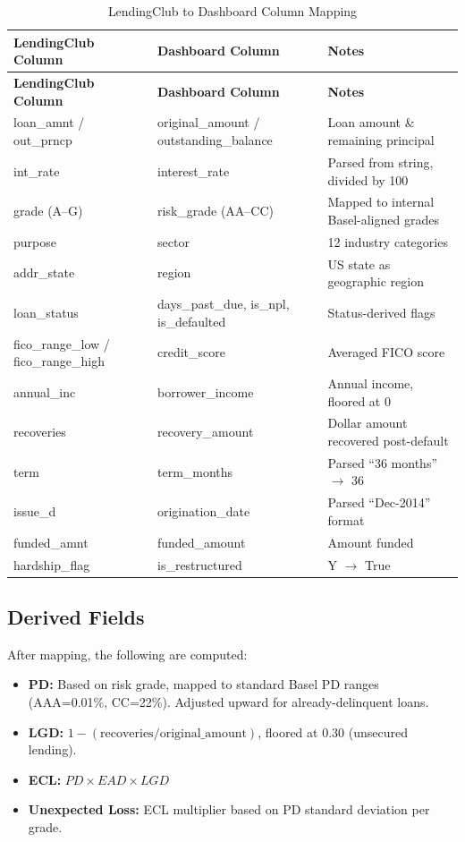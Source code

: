 \documentclass[12pt,a4paper]{article}
\begin{document}
\begin{longtable}{|>{\ttfamily\footnotesize}p{4.2cm}|>{\ttfamily\footnotesize}p{4.2cm}|p{4.5cm}|}
\caption{LendingClub to Dashboard Column Mapping}
\hline
\textbf{LendingClub Column} & \textbf{Dashboard Column} & \textbf{Notes} \\
\hline
\endfirsthead
\hline
\textbf{LendingClub Column} & \textbf{Dashboard Column} & \textbf{Notes} \\
\hline
\endhead
loan\_amnt / out\_prncp & original\_amount / outstanding\_balance & Loan amount \& remaining principal \\
int\_rate & interest\_rate & Parsed from string, divided by 100 \\
grade (A--G) & risk\_grade (AA--CC) & Mapped to internal Basel-aligned grades \\
purpose & sector & 12 industry categories \\
addr\_state & region & US state as geographic region \\
loan\_status & days\_past\_due, is\_npl, is\_defaulted & Status-derived flags \\
fico\_range\_low / fico\_range\_high & credit\_score & Averaged FICO score \\
annual\_inc & borrower\_income & Annual income, floored at 0 \\
recoveries & recovery\_amount & Dollar amount recovered post-default \\
term & term\_months & Parsed ``36 months'' $\rightarrow$ 36 \\
issue\_d & origination\_date & Parsed ``Dec-2014'' format \\
funded\_amnt & funded\_amount & Amount funded \\
hardship\_flag & is\_restructured & Y $\rightarrow$ True \\
\hline
\end{longtable}

\subsection{Derived Fields}

After mapping, the following are computed:

\begin{itemize}
    \item \textbf{PD:} Based on risk grade, mapped to standard Basel PD ranges (AAA=0.01\%, CC=22\%). Adjusted upward for already-delinquent loans.
    \item \textbf{LGD:} $1 - (\text{recoveries} / \text{original\_amount})$, floored at 0.30 (unsecured lending).
    \item \textbf{ECL:} $PD \times EAD \times LGD$
    \item \textbf{Unexpected Loss:} ECL multiplier based on PD standard deviation per grade.
\end{itemize}
\end{document}
